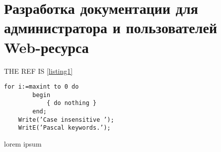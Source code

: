 \section{Разработка документации для администратора и пользователей Web-ресурса}



THE REF IS \ref{listing1}



\begin{lstlisting}[caption=example, xleftmargin=1.2cm]
    for i:=maxint to 0 do
        begin
            { do nothing }
        end;
    Write(’Case insensitive ’);
    WritE(’Pascal keywords.’);
    \end{lstlisting}
lorem ipsum

\clearpage
